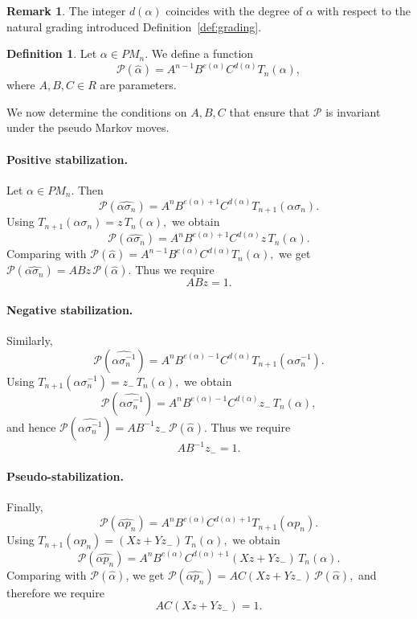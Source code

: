 \documentclass[11pt]{article}
\numberwithin{equation}{section}
\theoremstyle{definition}
\newtheorem{definition}[theorem]{Definition}
\newtheorem{remark}[theorem]{Remark}
\begin{document}
\begin{remark}
The integer \(d(\alpha)\) coincides with the degree of \(\alpha\) with respect to the natural grading introduced Definition~\ref{def:grading}.
\end{remark}


\begin{definition}
Let \(\alpha \in PM_n\). We define a function
\[
\mathcal P(\widehat{\alpha})
=
A^{n-1} B^{e(\alpha)} C^{d(\alpha)} T_n(\alpha),
\]
where \(A,B,C \in R\) are parameters.
\end{definition}

We now determine the conditions on \(A,B,C\) that ensure that \(\mathcal P\) is invariant under the pseudo Markov moves.


\paragraph{Positive stabilization.}
Let \(\alpha \in PM_n\). Then
\[
\mathcal P(\widehat{\alpha \sigma_n})
=
A^{n} B^{e(\alpha)+1} C^{d(\alpha)} T_{n+1}(\alpha \sigma_n).
\]
Using \(T_{n+1}(\alpha \sigma_n)=z\,T_n(\alpha),\) we obtain
\[
\mathcal P(\widehat{\alpha \sigma_n})
=
A^{n} B^{e(\alpha)+1} C^{d(\alpha)} z\,T_n(\alpha).
\]
Comparing with \(\mathcal P(\widehat{\alpha})
=
A^{n-1} B^{e(\alpha)} C^{d(\alpha)} T_n(\alpha),
\) we get \(\mathcal P(\widehat{\alpha \sigma_n})
=
ABz\,\mathcal P(\widehat{\alpha}).
\) Thus we require
\begin{equation}\label{eqpos}
  ABz=1.  
\end{equation}

\paragraph{Negative stabilization.}
Similarly, 
\[\mathcal P(\widehat{\alpha \sigma_n^{-1}})
=
A^{n} B^{e(\alpha)-1} C^{d(\alpha)} T_{n+1}(\alpha \sigma_n^{-1}).
\]
Using \(T_{n+1}(\alpha \sigma_n^{-1})=z_-\,T_n(\alpha),
\) we obtain
\[
\mathcal P(\widehat{\alpha \sigma_n^{-1}})
=
A^{n} B^{e(\alpha)-1} C^{d(\alpha)} z_-\,T_n(\alpha),
\]
and hence
\(
\mathcal P(\widehat{\alpha \sigma_n^{-1}})
=
AB^{-1}z_-\,\mathcal P(\widehat{\alpha}).
\) Thus we require
\begin{equation}\label{eqpneg}
AB^{-1}z_-=1.
\end{equation}


\paragraph{Pseudo-stabilization.}
Finally,
\[
\mathcal P(\widehat{\alpha p_n})
=
A^{n} B^{e(\alpha)} C^{d(\alpha)+1} T_{n+1}(\alpha p_n).
\]
Using \(T_{n+1}(\alpha p_n)=(Xz+Yz_-)\,T_n(\alpha),
\) we obtain 
\[
\mathcal P(\widehat{\alpha p_n})
=
A^{n} B^{e(\alpha)} C^{d(\alpha)+1} (Xz+Yz_-)\,T_n(\alpha).
\] 
Comparing with \(\mathcal P(\widehat{\alpha})\), we get \(\mathcal P(\widehat{\alpha p_n})
=
AC(Xz+Yz_-)\,\mathcal P(\widehat{\alpha}),\) and therefore we require
\begin{equation}\label{eqppseudo}
AC(Xz+Yz_-)=1.
\end{equation}
\end{document}
